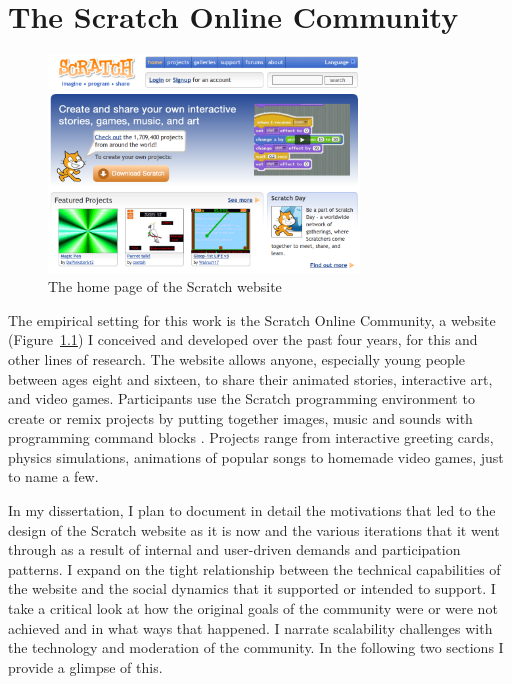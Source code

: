 \chapter{The Scratch Online Community}

\begin{figure}
\centering
\includegraphics[width=3.25in]{figures/websitehomepage.png}
\caption{The home page of the Scratch website}
\label{fig:websitehomepage}
\end{figure}

The empirical setting for this work is the Scratch Online Community, a website (Figure~\ref{fig:websitehomepage}) I conceived and developed over the past four years, for this and other lines of research.
The website allows anyone, especially young people between ages eight and sixteen, to share their animated stories, interactive art, and video games. Participants use the Scratch programming environment to create or remix projects by putting together images, music and sounds with programming command blocks \citep{resnick_scratch:_2009}.
Projects range from interactive greeting cards, physics simulations, animations of popular songs to homemade video games, just to name a few.  

In my dissertation, I plan to document in detail the motivations that led to the design of the Scratch website as it is now and the various iterations that it went through as a result of internal and user-driven demands and participation patterns.
I expand on the tight relationship between the technical capabilities of the website and the social dynamics that it supported or intended to support.
I take a critical look at how the original goals of the community were or were not achieved and in what ways that happened. 
I narrate scalability challenges with the technology and moderation of the community.
In the following two sections I provide a glimpse of this.


